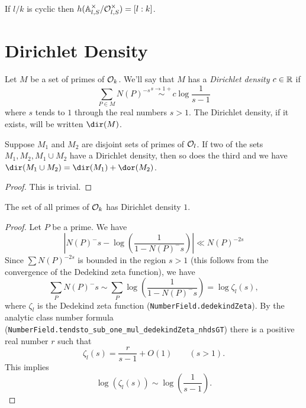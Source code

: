 \begin{corollary}
	If $l/k$ is cyclic then $h({\mathbb A}_{l,S}^\times / {\mathcal O}_{l,S}^\times) = [l:k]$.
\end{corollary}




\section{Dirichlet Density}

\begin{definition} \label{def:Dirichlet density}
	Let $M$ be a set of primes of ${\mathcal O}_k$.
	We'll say that $M$ has a \emph{Dirichlet density} $c \in {\mathbb R}$ if
	\[
		\sum_{P \in M} N(P)^{-s} \stackrel{s \to 1+}\sim c \log\frac{1}{s-1}
	\]
	where $s$ tends to $1$ through the real numbers $s>1$.
	The Dirichlet density, if it exists, will be written $\dir(M)$.
\end{definition}


\begin{lemma}
	Suppose $M_1$ and $M_2$ are disjoint sets of primes of ${\mathcal O}_l$.
	If two of the sets $M_1, M_2, M_1 \cup M_2$ have a Dirichlet density, then so does the third
	and we have $\dir(M_1 \cup M_2) = \dir(M_1) + \dor(M_2)$.
\end{lemma}

\begin{proof}
	This is trivial.
\end{proof}

\begin{lemma} \label{lem:Dirichlet density top}
	The set of all primes of ${\mathcal O}_k$ has Dirichlet density $1$.
\end{lemma}

\begin{proof}
	Let $P$ be a prime. We have
	\[
		\left|N(P)^-s - \log\left( \frac{1}{1-N(P)^-s}\right)\right| \ll N(P)^{-2s}
	\]
	Since $\sum N(P)^{-2s}$ is bounded in the region $s > 1$ (this follows from the convergence of the
	Dedekind zeta function), we have
	\[
		\sum_P N(P)^-s
		\sim
		\sum_P \log\left( \frac{1}{1-N(P)^-s} \right)
		=
		\log \zeta_l(s),
	\]
	where $\zeta_l$ is the Dedekind zeta function (\texttt{NumberField.dedekindZeta}).
	By the analytic class number formula (\texttt{NumberField.tendsto_sub_one_mul_dedekindZeta_nhdsGT})
	there is a positive real number $r$ such that
	\[
		\zeta_l(s) = \frac{r}{s-1} + O(1) \qquad (s > 1).
	\]
	This implies
	\[
		\log(\zeta_l(s)) \sim \log\left( \frac{1}{s-1}\right).
	\]
\end{proof}



